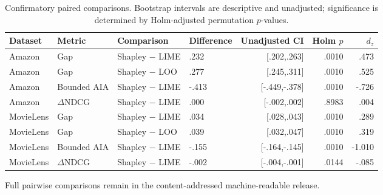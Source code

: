 \begin{table}[ht]
\centering\scriptsize
\setlength{\tabcolsep}{2pt}
\caption{Confirmatory paired comparisons. Bootstrap intervals are descriptive and unadjusted; significance is determined by Holm-adjusted permutation $p$-values.}
\label{tab:app-statistics}
\begin{tabular}{@{}llp{}p{}rrr@{}}
\toprule
Dataset & Metric & Comparison & Difference & Unadjusted CI & Holm $p$ & $d_z$ \\
\midrule
Amazon & Gap & Shapley $-$ LIME & .232 & [.202,.263] & .0010 & .473 \\
Amazon & Gap & Shapley $-$ LOO & .277 & [.245,.311] & .0010 & .525 \\
Amazon & Bounded AIA & Shapley $-$ LIME & -.413 & [-.449,-.378] & .0010 & -.726 \\
Amazon & $\Delta$NDCG & Shapley $-$ LIME & .000 & [-.002,.002] & .8983 & .004 \\
MovieLens & Gap & Shapley $-$ LIME & .034 & [.028,.043] & .0010 & .289 \\
MovieLens & Gap & Shapley $-$ LOO & .039 & [.032,.047] & .0010 & .319 \\
MovieLens & Bounded AIA & Shapley $-$ LIME & -.155 & [-.164,-.145] & .0010 & -1.010 \\
MovieLens & $\Delta$NDCG & Shapley $-$ LIME & -.002 & [-.004,-.001] & .0144 & -.085 \\
\bottomrule
\end{tabular}
\end{table}

\noindent Full pairwise comparisons remain in the content-addressed machine-readable release.
